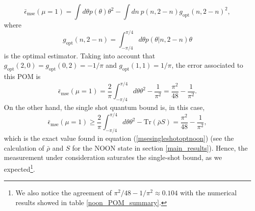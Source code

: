 \begin{equation}
\bar{\epsilon}_{\mathrm{mse}}(\mu=1) = \int d\theta p(\theta) \theta^2 - \int dn~ p(n,2-n) g_{\mathrm{opt}}(n,2-n)^2,
\end{equation}
where
\begin{equation}
g_{\mathrm{opt}}(n,2-n) = \int_{-\pi/4}^{\pi/4} d\theta p(\theta|n,2-n)\theta
\end{equation}
is the optimal estimator. Taking into account that $g_{\mathrm{opt}}(2,0) = g_{\mathrm{opt}}(0,2) = -1/\pi$ and $g_{\mathrm{opt}}(1,1) = 1/\pi$, the error associated to this POM is
\begin{equation}
\bar{\epsilon}_{\mathrm{mse}}(\mu=1) = \frac{2}{\pi}\int_{-\pi/4}^{\pi/4} d\theta \theta^2 - \frac{1}{\pi^2} = \frac{\pi^2}{48} - \frac{1}{\pi^2}.
\label{msesingleshotoptnoon}
\end{equation}
On the other hand, the single shot quantum bound is, in this case,
\begin{equation}
\bar{\epsilon}_{\mathrm{mse}}(\mu=1) \geqslant \frac{2}{\pi}\int_{-\pi/4}^{\pi/4} d\theta \theta^2 - \mathrm{Tr}(\bar{\rho}S) =
\frac{\pi^2}{48} - \frac{1}{\pi^2},
\label{mse_analytical_noon}
\end{equation}
which is the exact value found in equation (\ref{msesingleshotoptnoon}) (see the calculation of $\bar{\rho}$ and $S$ for the NOON state in section \ref{main_results}). Hence, the measurement under consideration saturates the single-shot bound, as we expected\footnote{We also notice the agreement of $\pi^2/48 - 1/\pi^2 \approx 0.104$ with the numerical results showed in table \ref{noon_POM_summary}.}.

